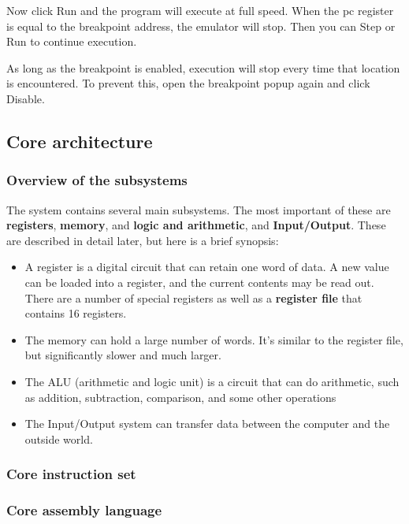\documentclass[11pt]{article}
\begin{document}
\begin{itemize}
\begin{itemize}
Now click Run and the program will execute at full speed.  When the pc
register is equal to the breakpoint address, the emulator will stop.
Then you can Step or Run to continue execution.

As long as the breakpoint is enabled, execution will stop every time
that location is encountered.  To prevent this, open the breakpoint
popup again and click Disable.
\end{itemize}
\end{itemize}

\subsection*{Core architecture}
\label{sec:org26dd06b}
\subsubsection*{Overview of the subsystems}
\label{sec:org09f16ea}

The system contains several main subsystems.  The most important of
these are \textbf{registers}, \textbf{memory}, and \textbf{logic and arithmetic}, and
\textbf{Input/Output}.  These are described in detail later, but here is a
brief synopsis:

\begin{itemize}
\item A register is a digital circuit that can retain one word of data.  A
new value can be loaded into a register, and the current contents
may be read out.  There are a number of special registers as well as
a \textbf{register file} that contains 16 registers.

\item The memory can hold a large number of words.  It's similar to the
register file, but significantly slower and much larger.

\item The ALU (arithmetic and logic unit) is a circuit that can do
arithmetic, such as addition, subtraction, comparison, and some
other operations

\item The Input/Output system can transfer data between the computer and
the outside world.
\end{itemize}
\subsubsection*{Core instruction set}
\label{sec:org0e68708}
\subsubsection*{Core assembly language}
\label{sec:orgeb685a5}
\end{document}

